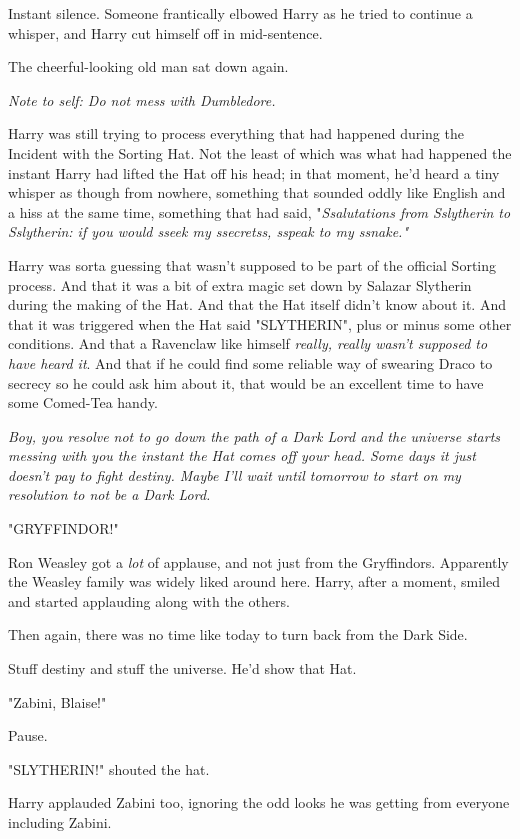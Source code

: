 Instant silence. Someone frantically elbowed Harry as he tried to continue a 
whisper, and Harry cut himself off in mid-sentence.

The cheerful-looking old man sat down again.

\emph{Note to self: Do not mess with Dumbledore.}

Harry was still trying to process everything that had happened during the 
Incident with the Sorting Hat. Not the least of which was what had happened the 
instant Harry had lifted the Hat off his head; in that moment, he'd heard a 
tiny whisper as though from nowhere, something that sounded oddly like English 
and a hiss at the same time, something that had said, "\emph{Ssalutations from 
Sslytherin to Sslytherin: if you would sseek my ssecretss, sspeak to my 
ssnake."}

Harry was sorta guessing that wasn't supposed to be part of the official 
Sorting process. And that it was a bit of extra magic set down by Salazar 
Slytherin during the making of the Hat. And that the Hat itself didn't know 
about it. And that it was triggered when the Hat said "SLYTHERIN", plus or 
minus some other conditions. And that a Ravenclaw like himself \emph{really, 
really wasn't supposed to have heard it}. And that if he could find some 
reliable way of swearing Draco to secrecy so he could ask him about it, that 
would be an excellent time to have some Comed-Tea handy.

\emph{Boy, you resolve not to go down the path of a Dark Lord and the universe 
starts messing with you the instant the Hat comes off your head. Some days it 
just doesn't pay to fight destiny. Maybe I'll wait until tomorrow to start on 
my resolution to not be a Dark Lord.}

"GRYFFINDOR!"

Ron Weasley got a \emph{lot} of applause, and not just from the Gryffindors. 
Apparently the Weasley family was widely liked around here. Harry, after a 
moment, smiled and started applauding along with the others.

Then again, there was no time like today to turn back from the Dark Side.

Stuff destiny and stuff the universe. He'd show that Hat.

"Zabini, Blaise!"

Pause.

"SLYTHERIN!" shouted the hat.

Harry applauded Zabini too, ignoring the odd looks he was getting from everyone 
including Zabini.

